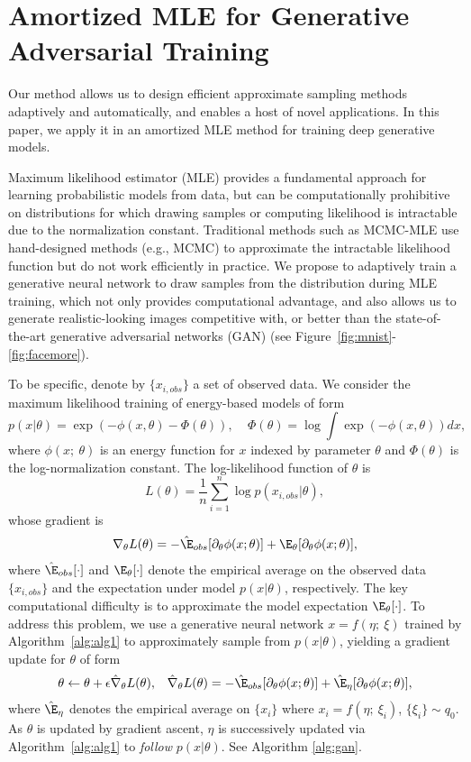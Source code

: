 \documentclass{article} \usepackage{iclr2017_conference,times}
\begin{document}
\section{Amortized MLE for Generative Adversarial Training}
Our method allows us to design efficient approximate sampling methods 
adaptively and automatically, and enables a host of novel applications. 
In this paper, we apply it in an amortized MLE method for training deep generative models.   


Maximum likelihood estimator (MLE) provides a fundamental approach for learning probabilistic models from data, 
but can be computationally prohibitive on distributions for which drawing samples or computing likelihood is intractable due to the normalization constant. 
Traditional methods such as MCMC-MLE use hand-designed methods (e.g., MCMC) to approximate the intractable likelihood function but do not work efficiently in practice. 
We propose to adaptively train a generative neural network to draw samples from the distribution during MLE training, which not only provides computational advantage, and also allows us to generate realistic-looking images competitive with, or better than the state-of-the-art generative adversarial networks (GAN) \citep{goodfellow2014generative, radford2015unsupervised} (see Figure~\ref{fig:mnist}-\ref{fig:facemore}).  


To be specific, denote by $\{x_{i,obs}\}$ a set of observed data. 
We consider the maximum likelihood training of energy-based models of form 
$$
p(x|\theta) = \exp(-\phi(x, \theta) - \Phi(\theta)), ~~~~~ \Phi(\theta) = \log \int \exp(-\phi(x,\theta))dx,
$$
where $\phi(x; ~\theta)$ is an energy function for $x$ indexed by parameter $\theta$ and $\Phi(\theta)$ is the log-normalization constant. The log-likelihood function of $\theta$ is $$
L(\theta)  =\frac{1}{n}\sum_{i=1}^n\log p(x_{i,obs} | \theta),
$$
whose gradient is \begin{align*}\nabla_\theta L(\theta) = -  \hat\E_{obs} [\partial_\theta \phi (x; \theta) ] +    \E_\theta [\partial_\theta \phi(x; \theta) ], 
\end{align*}
where $\hat\E_{obs}[\cdot]$ and $\E_\theta[\cdot]$ denote the empirical average on the observed data $\{x_{i,obs}\}$
and the expectation under model $p(x |\theta)$, respectively.  
The key computational difficulty is to approximate the model expectation $\E_{\theta}[\cdot]$. 
To address this problem, 
we use a generative neural network $x = f(\eta;~\xi)$ trained by Algorithm~\ref{alg:alg1} 
to approximately sample from $p(x|\theta)$, yielding a gradient update for $\theta$ of form
\begin{align}\label{equ:updatetheta}
\theta \gets \theta + \epsilon \hat\nabla_\theta L(\theta),  &\text{}& 
 \hat \nabla_\theta L(\theta) =  - \hat\E_{obs} [\partial_\theta \phi (x; \theta) ] +   \hat\E_{\eta} [\partial_\theta \phi(x; \theta) ], 
\end{align}
where $\hat \E_{\eta}$ denotes the empirical average on $\{x_i\}$ where $x_i = f(\eta;~\xi_i)$, 
$\{\xi_i\}\sim q_0$. 
As $\theta$ is updated by gradient ascent, 
$\eta$ is successively updated via Algorithm~\ref{alg:alg1} to \emph{follow} $p(x|\theta)$. 
See Algorithm \ref{alg:gan}. 
\end{document}
